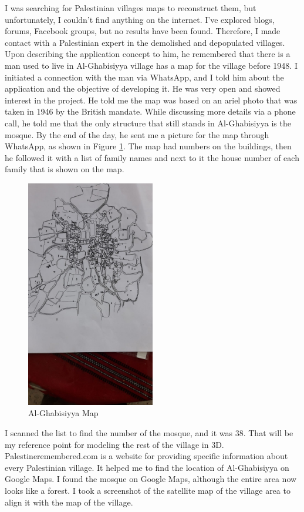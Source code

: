 I was searching for Palestinian villages maps to reconstruct them, but unfortunately, I couldn't find anything on the internet. I've explored blogs, forums, Facebook groups, but no results have been found. Therefore, I made contact with a Palestinian expert in the demolished and depopulated villages. Upon describing the application concept to him, he remembered that there is a man used to live in Al-Ghabisiyya village has a map for the village before 1948. I initiated a connection with the man via WhatsApp, and I told him about the application and the objective of developing it. He was very open and showed interest in the project.  
He told me the map was based on an ariel photo that was taken in 1946 by the British mandate. While discussing more details via a phone call, he told me that the only structure that still stands in Al-Ghabisiyya is the mosque. By the end of the day, he sent me a picture for the map through WhatsApp, as shown in Figure \ref{fig:ghmap}. The map had numbers on the buildings, then he followed it with a list of family names and next to it the house number of each family that is shown on the map. 
\begin{figure}[ht]
    \centering
    \includegraphics[width=0.50\textwidth, angle=270]{images/ALGHABS_MAP.jpeg}
    \caption{Al-Ghabisiyya Map}
    \label{fig:ghmap}
\end{figure} 
 
I scanned the list to find the number of the mosque, and it was 38. That will be my reference point for modeling the rest of the village in 3D. Palestineremembered.com is a website for providing specific information about every Palestinian village. It helped me to find the location of Al-Ghabisiyya on Google Maps. I found the mosque on Google Maps, although the entire area now looks like a forest. I took a screenshot of the satellite map of the village area to align it with the map of the village.

